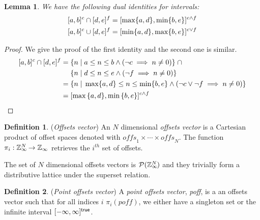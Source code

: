 \documentclass[acmlarge,review]{acmart}
\theoremstyle{definition}
\newtheorem{defn}{Definition}
\theoremstyle{plain}
\newtheorem{lem}{Lemma}
\theoremstyle{remark}
\begin{document}
\begin{lem}{}\label{lem:zinf-identities}
  We have the following dual identities for \zinf{} intervals:
%
  \begin{align*}
    \textnormal{$\lbrack a,b\rbrack^{c}$} \cap \textnormal{$\lbrack d,e\rbrack^{f}$} & =
      \textnormal{$\lbrack\max \{a,d\},\min \{b,e\}\rbrack^{c \wedge f}$} \\
    \textnormal{$\lbrack a,b\rbrack^{c}$} \cup \textnormal{$\lbrack d,e\rbrack^{f}$} & =
      \textnormal{$\lbrack\min \{a,d\},\max \{b,e\}\rbrack^{c \vee f}$}
  \end{align*}
\end{lem}
%
\begin{proof}
  We give the proof of the first identity and the second one is similar.
  \begin{align*}
    \textnormal{$\lbrack a,b\rbrack^{c}$} \cap \textnormal{$\lbrack d,e\rbrack^{f}$} = &
      \; \{ n \;|\; a \leq n \leq b \wedge (\neg c \implies n \neq 0) \}
      \;\cap \\
      & \; \{ n \;|\; d \leq n \leq e \wedge (\neg f \implies n \neq 0) \}
      \\
    = & \; \{ n \;|\; \max \{a,d\} \leq n \leq \min \{b,e\} \wedge (\neg c
      \vee \neg f \implies n \neq 0) \} \\
    = & \; \textnormal{$\lbrack\max{\{a,d\}},\min{\{b,e\}}\rbrack^{c \wedge f}$}
  \end{align*}
\end{proof}

\begin{defn}{(\emph{Offsets vector})}
  An $N$ dimensional \emph{offsets vector} is a Cartesian product of offset
  spaces denoted with $\textit{offs}_1 \times \cdots \times \textit{offs}_N$.
  The function $\pi_i : \textnormal{$\mathbb{Z}_\infty$}{}^{\mkern-19mu{N}} \to \textnormal{$\mathbb{Z}_\infty$}{}$ retrieves the
  $i^{th}$ set of offsets.

  The set of $N$ dimensional offsets vectors is
  $\mathcal{P}{(\textnormal{$\mathbb{Z}_\infty$}{}^{\mkern-19mu{N}})}$ and they trivially form a
  distributive lattice under the superset relation.
\end{defn}

\begin{defn}{(\emph{Point offsets vector})}
  A \emph{point offsets vector}, \textit{poff}, is a an offsets vector such that
  for all indices $i$ $\pi_i(\textit{poff})$, we either have a singleton set or
  the infinite interval $\textnormal{$\lbrack-\infty,\infty\rbrack^{\textsf{true}}$}$.
\end{defn}
\end{document}
